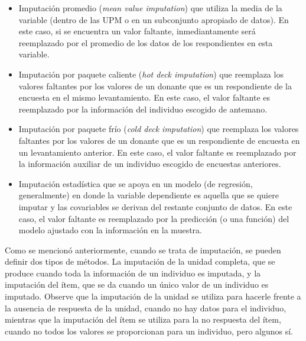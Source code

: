 \documentclass[
  12pt,
  spanish,
]{book}
\providecommand{\tightlist}{%
  \setlength{\itemsep}{0pt}\setlength{\parskip}{0pt}}
\begin{document}
\begin{itemize}
\tightlist
\item
  Imputación promedio (\emph{mean value imputation}) que utiliza la media de la variable (dentro de las UPM o en un subconjunto apropiado de datos). En este caso, si se encuentra un valor faltante, inmediantamente será reemplazado por el promedio de los datos de los respondientes en esta variable.
\item
  Imputación por paquete caliente (\emph{hot deck imputation}) que reemplaza los valores faltantes por los valores de un donante que es un respondiente de la encuesta en el mismo levantamiento. En este caso, el valor faltante es reemplazado por la información del individuo escogido de antemano.
\item
  Imputación por paquete frío (\emph{cold deck imputation}) que reemplaza los valores faltantes por los valores de un donante que es un respondiente de encuesta en un levantamiento anterior. En este caso, el valor faltante es reemplazado por la información auxiliar de un individuo escogido de encuestas anteriores.
\item
  Imputación estadística que se apoya en un modelo (de regresión, generalmente) en donde la variable dependiente es aquella que se quiere imputar y las covariables se derivan del restante conjunto de datos. En este caso, el valor faltante es reemplazado por la predicción (o una función) del modelo ajustado con la información en la muestra.
\end{itemize}

Como se mencionó anteriormente, cuando se trata de imputación, se pueden definir dos tipos de métodos. La imputación de la unidad completa, que se produce cuando toda la información de un individuo es imputada, y la imputación del ítem, que se da cuando un único valor de un individuo es imputado. Observe que la imputación de la unidad se utiliza para hacerle frente a la ausencia de respuesta de la unidad, cuando no hay datos para el individuo, mientras que la imputación del ítem se utiliza para la no respuesta del ítem, cuando no todos los valores se proporcionan para un individuo, pero algunos sí.
\end{document}
